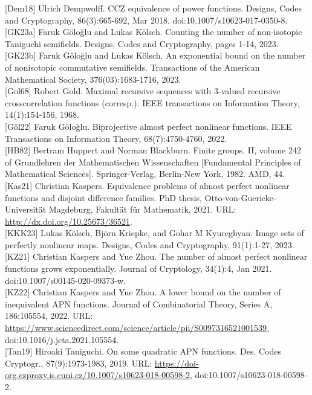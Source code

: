 \documentclass[10pt]{article}
\begin{document}
[Dem18] Ulrich Dempwolff. CCZ equivalence of power functions. Designs, Codes and Cryptography, 86(3):665-692, Mar 2018. doi:10.1007/s10623-017-0350-8.\\[0pt]
[GK23a] Faruk Göloğlu and Lukas Kölsch. Counting the number of non-isotopic Taniguchi semifields. Designs, Codes and Cryptography, pages 1-14, 2023.\\[0pt]
[GK23b] Faruk Göloğlu and Lukas Kölsch. An exponential bound on the number of nonisotopic commutative semifields. Transactions of the American Mathematical Society, 376(03):1683-1716, 2023.\\[0pt]
[Gol68] Robert Gold. Maximal recursive sequences with 3-valued recursive crosscorrelation functions (corresp.). IEEE transactions on Information Theory, 14(1):154-156, 1968.\\[0pt]
[Göl22] Faruk Göloğlu. Biprojective almost perfect nonlinear functions. IEEE Transactions on Information Theory, 68(7):4750-4760, 2022.\\[0pt]
[HB82] Bertram Huppert and Norman Blackburn. Finite groups. II, volume 242 of Grundlehren der Mathematischen Wissenschaften [Fundamental Principles of Mathematical Sciences]. Springer-Verlag, Berlin-New York, 1982. AMD, 44.\\[0pt]
[Kas21] Christian Kaspers. Equivalence problems of almost perfect nonlinear functions and disjoint difference families. PhD thesis, Otto-von-Guericke-Universität Magdeburg, Fakultät für Mathematik, 2021. URL: \href{http://dx.doi.org/10.25673/36521}{http://dx.doi.org/10.25673/36521}.\\[0pt]
[KKK23] Lukas Kölsch, Björn Kriepke, and Gohar M Kyureghyan. Image sets of perfectly nonlinear maps. Designs, Codes and Cryptography, 91(1):1-27, 2023.\\[0pt]
[KZ21] Christian Kaspers and Yue Zhou. The number of almost perfect nonlinear functions grows exponentially. Journal of Cryptology, 34(1):4, Jan 2021. doi:10.1007/s00145-020-09373-w.\\[0pt]
[KZ22] Christian Kaspers and Yue Zhou. A lower bound on the number of inequivalent APN functions. Journal of Combinatorial Theory, Series A, 186:105554, 2022. URL: \href{https://www.sciencedirect.com/science/article/pii/S0097316521001539}{https://www.sciencedirect.com/science/article/pii/S0097316521001539}, doi:10.1016/j.jcta.2021.105554.\\[0pt]
[Tan19] Hiroaki Taniguchi. On some quadratic APN functions. Des. Codes Cryptogr., 87(9):1973-1983, 2019. URL: \href{https://doi-org.ezproxy.is.cuni.cz/10.1007/s10623-018-00598-2}{https://doi-org.ezproxy.is.cuni.cz/10.1007/s10623-018-00598-2}, doi:10.1007/s10623-018-00598-2.\\[0pt]
\end{document}
